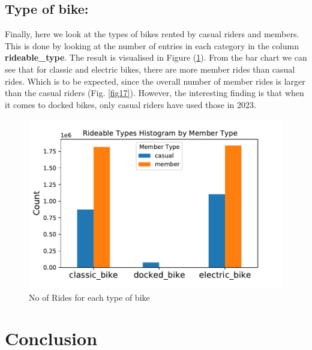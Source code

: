 \documentclass[12pt]{article}
\begin{document}
\subsection{Type of bike:}
Finally, here we look at the types of bikes rented by casual riders and members. This is done by looking at the number of entries in each category in the column \textbf{rideable\_type}. The result is visualised in Figure (\underline{\ref{fig16}}). From the bar chart we can see that for classic and electric bikes, there are more member rides than casual rides. Which is to be expected, since the overall number of member rides is larger than the casual riders (Fig. \ref{fig17}). However, the interesting finding is that when it comes to docked bikes, only casual riders have used those in 2023.
	
	\begin{figure}[h]
	\centering
	\includegraphics[scale=0.6]{rideable_types.pdf} 
	\caption{No of Rides for each type of bike}
	\label{fig16}
	\end{figure}
	


\section{Conclusion}
\end{document}
